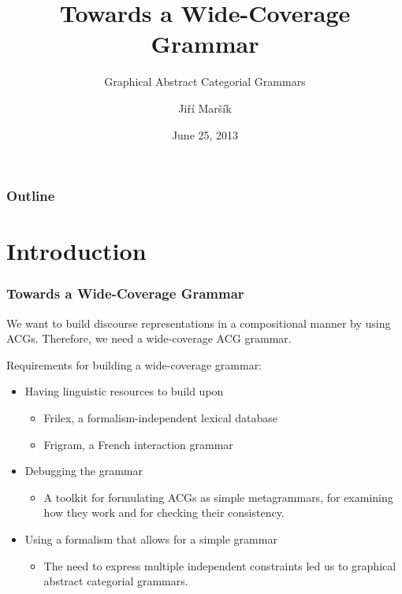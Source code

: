 \documentclass{beamer}
\begin{document}
\title[G-ACGs]{Towards a Wide-Coverage Grammar}
\subtitle{Graphical Abstract Categorial Grammars}
\author{Ji\v{r}\'{i} Mar\v{s}\'{i}k}
\date[June 2013]{June 25, 2013}

\frame{\titlepage}

\begin{frame}
\frametitle{Outline}
\tableofcontents
\end{frame}

\section{Introduction}

\begin{frame}
  \frametitle{Towards a Wide-Coverage Grammar}

  We want to build discourse representations in a compositional manner
  by using ACGs. Therefore, we need a wide-coverage ACG grammar.

  \vspace{3 mm}

  Requirements for building a wide-coverage grammar:
    \begin{itemize}
    \item Having linguistic resources to build upon
      \begin{itemize}
      \item Frilex, a formalism-independent lexical database
      \item Frigram, a French interaction grammar
      \end{itemize}
    \item Debugging the grammar
      \begin{itemize}
        \item A toolkit for formulating ACGs as simple metagrammars, for
          examining how they work and for checking their consistency.
      \end{itemize}
    \item Using a formalism that allows for a simple grammar
      \begin{itemize}
      \item The need to express multiple independent constraints led us
        to graphical abstract categorial grammars.
      \end{itemize}
    \end{itemize}
\end{frame}
\end{document}
